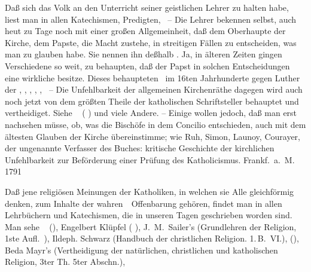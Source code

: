 \begin{aufza}
\item Daß sich das Volk an den Unterricht seiner geistlichen Lehrer zu halten habe, liest man in allen Katechismen, Predigten, \usw\ -- Die Lehrer bekennen selbst, auch heut zu Tage noch mit einer großen Allgemeinheit, daß dem Oberhaupte der Kirche, dem Papste, die Macht zustehe, in streitigen Fällen zu entscheiden, was man zu glauben habe. Sie nennen ihn deßhalb . Ja, in älteren Zeiten gingen Verschiedene so weit, zu behaupten, daß der Papst in solchen Entscheidungen eine wirkliche  besitze. Dieses behaupteten \zB\ im 16ten Jahrhunderte gegen Luther der , , , , , \uA\ -- Die Unfehlbarkeit der allgemeinen Kirchenräthe dagegen wird auch noch jetzt von dem größten Theile der katholischen Schriftsteller behauptet und vertheidiget. Siehe \zB\  ( ) und viele Andere. -- Einige wollen jedoch, daß man erst nachsehen müsse, ob, was die Bischöfe in dem Concilio entschieden, auch mit dem ältesten Glauben der Kirche übereinstimme; wie Ruh, Simon, Launoy, Courayer, der ungenannte Verfasser des Buches: kritische Geschichte der kirchlichen Unfehlbarkeit zur Beförderung einer  Prüfung des Katholicismus. Frankf.~a.~M. 1791 \uA
\item Daß jene religiösen Meinungen der Katholiken, in welchen sie Alle gleichförmig denken, zum Inhalte der wahren~\ Offenbarung gehören, findet man in allen Lehrbüchern und Katechismen, die in unseren Tagen geschrieben worden sind. Man sehe \zB\  (), Engelbert Klüpfel ( ), J.~M.~Sailer's (Grundlehren der Religion, 1ste Aufl.\ ), Ildeph. Schwarz (Handbuch der christlichen Religion. 1.\,B.\ VI.),  (), Beda Mayr's (Vertheidigung der natürlichen, christlichen und katholischen Religion, 3ter Th. 5ter Abschn.), \uA


\end{aufza}
